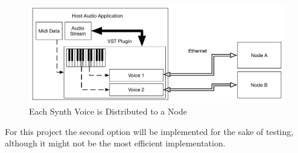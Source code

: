 \begin{figure}[H]
    \centering
    \includegraphics[width=\textwidth]{assets/distribute_byvoice.pdf}
    \caption{Each Synth Voice is Distributed to a Node}
    \label{fig:pervoice}
\end{figure}

For this project the second option will be implemented for the sake of testing, although it might not be the most efficient implementation.